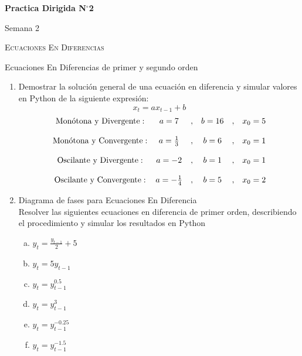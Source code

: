 \documentclass[11pt,a4paper]{article}
\begin{document}
	\begin{center}
		{\Large {\textbf{Practica Dirigida N$^{\circ}$2}}}
		
		\small{Semana 2}
		
		\textsc{Ecuaciones En Diferencias}
		
		Ecuaciones En Diferencias de primer y segundo orden
		
	\end{center}

\begin{enumerate}
		\item Demostrar la solución general de una ecuación en diferencia y simular valores en Python de la siguiente expresión: $$x_{t} = ax_{t-1} + b$$
			\begin{equation*}
				\begin{matrix}
					\textup{Monótona y Divergente}: 	 & a = 7 &, 		   & b=16 &, &x_{0}=5\\
					\\
					\textup{Monótona y Convergente}:	 & a = \frac{1}{3} &,  & b=6  &,  &x_{0}=1\\
					\\
					\textup{Oscilante y Divergente}:  & a = -2 &, 		   & b=1  &,  &x_{0}=1\\
					\\
					\textup{Oscilante y Convergente}: & a = -\frac{1}{4} &, & b=5  &,  &x_{0}=2
				\end{matrix}
			\end{equation*}
		\item Diagrama de fases para Ecuaciones En Diferencia\\
		Resolver las siguientes ecuaciones en diferencia de primer orden, describiendo el procedimiento y simular los resultados en Python
			\begin{multicols}{2}
				\begin{enumerate}[a)]
					\item $y_{t} = \frac{y_{t-1}}{2}+5$
					\item $y_{t} = 5y_{t-1}$
					\item $y_{t} = y_{t-1}^{0.5}$ %
					\item $y_{t} = y_{t-1}^{3}$ %
					\item $y_{t} = y_{t-1}^{-0.25}$ %
					\item $y_{t} = y_{t-1}^{-1.5}$ %

\end{enumerate}
\end{multicols}
\end{enumerate}
\end{document}
